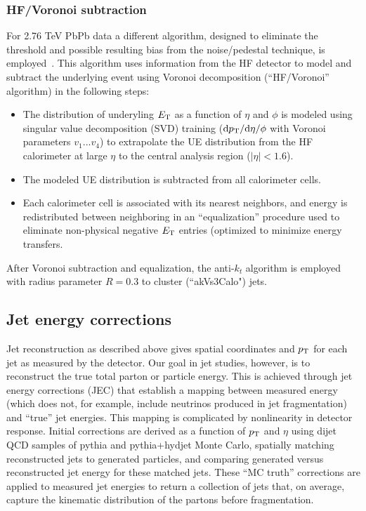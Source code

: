 \subsubsection{HF/Voronoi subtraction}
For 2.76 TeV PbPb data a different algorithm, designed to eliminate the threshold and possible resulting bias from the noise/pedestal technique, is employed~\cite{AN_2014_024}.  This algorithm uses information from the HF detector to model and subtract the underlying event using Voronoi decomposition (``HF/Voronoi'' algorithm) in the following steps: 
\begin{itemize}
\item The distribution of underyling $E_{\rm T}$ as a function of $\eta$ and $\phi$ is modeled using singular value decomposition (SVD) training (${\rm d}p_{\rm T}/{\rm d}\eta / {\rm }\phi$ with Voronoi parameters $v_{1}...v_{4}$) to extrapolate the UE distribution from the HF calorimeter at large $\eta$ to the central analysis region ($|\eta| < 1.6$).
\item The modeled UE distribution is subtracted from all calorimeter cells.
\item Each calorimeter cell is associated with its nearest neighbors, and energy is redistributed between neighboring in an ``equalization'' procedure used to eliminate non-physical negative $E_{\rm T}$ entries (optimized to minimize energy transfers.
\end{itemize}

\noindent After Voronoi subtraction and equalization, the anti-$k_{t}$ algorithm is employed with radius parameter $R = 0.3$ to cluster (``akVs3Calo") jets.

\subsection{Jet energy corrections}
\label{sec:JEC}

Jet reconstruction as described above gives spatial coordinates and $p_{\rm T}$ for each jet as measured by the detector.  Our goal in jet studies, however, is to reconstruct the true total parton or particle energy.  This is achieved through jet energy corrections (JEC) that establish a mapping between measured energy (which does not, for example, include neutrinos produced in jet fragmentation) and ``true'' jet energies.  This mapping is complicated by nonlinearity in detector response.  Initial corrections are derived as a function of $p_{\rm T}$ and $\eta$ using dijet QCD samples of {\sc pythia} and {\sc pythia+hydjet} Monte Carlo, spatially matching reconstructed jets to generated particles, and comparing generated versus reconstructed jet energy for these matched jets.  These ``MC truth'' corrections are applied to measured jet energies to return a collection of jets that, on average, capture the kinematic distribution of the partons before fragmentation.

